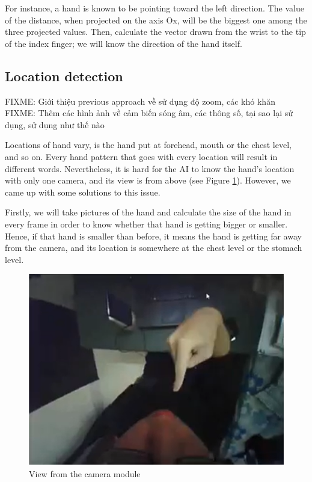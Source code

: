For instance, a hand is known to be pointing toward the left direction. The value of the distance, when projected on the axis Ox, will be the biggest one among the three projected values. Then, calculate the vector drawn from the wrist to the tip of the index finger; we will know the direction of the hand itself.

\subsection{Location detection}
FIXME: Giới thiệu previous approach về sử dụng độ zoom, các khó khăn
FIXME: Thêm các hình ảnh về cảm biến sóng âm, các thông số, tại sao lại sử dụng, sử dụng như thế nào

Locations of hand vary, is the hand put at forehead, mouth or the chest level, and so on. Every hand pattern that goes with every location will result in different words. Nevertheless, it is hard for the AI to know the hand’s location with only one camera, and its view is from above (see Figure \ref{fig:Chap4-ViewFromCamera}). However, we came up with some solutions to this issue.

Firstly, we will take pictures of the hand and calculate the size of the hand in every frame in order to know whether that hand is getting bigger or smaller. Hence, if that hand is smaller than before, it means the hand is getting far away from the camera, and its location is somewhere at the chest level or the stomach level.

\begin{figure}[H]
  \centering
  \includegraphics[width=\textwidth]{img/Chap4/ViewFromCamera.png}
  \caption{View from the camera module}
  \label{fig:Chap4-ViewFromCamera}
\end{figure}

